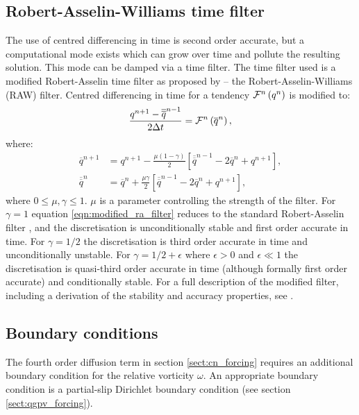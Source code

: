 \documentclass[a4paper]{book}
\begin{document}
\subsection{Robert-Asselin-Williams time filter}\label{sect:ra_filter}

The use of centred differencing in time is second order accurate, but a
computational mode exists which can grow over time and pollute the
resulting solution. This mode can be damped via a time filter. The time filter
used is a modified Robert-Asselin time filter as proposed by
\citet{williams2009a} -- the Robert-Asselin-Williams (RAW) filter. Centred
differencing in time for a tendency
${\cal{F}}^n \left( q^n \right)$ is modified to:
\begin{equation}
  \frac{q^{n + 1} - \overline{\overline{q}}^{n - 1}}{2 \Delta t} = {\cal{F}}^n \left( \overline{q}^n \right),
\end{equation}
where:
\begin{align}\label{eqn:modified_ra_filter}
  \overline{q}^{n + 1}        & = q^{n + 1} - \frac{\mu \left(1 - \gamma \right)}{2} \left[\overline{\overline{q}}^{n - 1} - 2 \overline{q}^n + q^{n + 1} \right], \nonumber \\
  \overline{\overline{q}}^{n} & = \overline{q}^n + \frac{\mu \gamma}{2} \left[\overline{\overline{q}}^{n - 1} - 2 \overline{q}^n + q^{n + 1} \right],
\end{align}
where $0 \leq \mu, \gamma \leq 1$. $\mu$ is a parameter controlling the strength
of the filter. For $\gamma = 1$ equation \eqref{eqn:modified_ra_filter} reduces to the
standard Robert-Asselin filter \citep{robert1966, asselin1972}, and the discretisation is
unconditionally stable and first order accurate in time. For $\gamma = 1 / 2$ the
discretisation is third order accurate in time and unconditionally unstable. For
$\gamma = 1 / 2 + \epsilon$ where $\epsilon > 0$ and $\epsilon \ll 1$ the
discretisation is quasi-third order accurate in time (although formally first
order accurate) and conditionally stable. For a full description of the modified
filter, including a derivation of the stability and accuracy properties, see
\citet{williams2009a}.

\subsection{Boundary conditions}\label{sect:cn_bc}

The fourth order diffusion term in section \ref{sect:cn_forcing}
requires an additional boundary condition for the relative vorticity $\omega$.
An appropriate boundary condition is a partial-slip Dirichlet boundary condition
(see section \ref{sect:qgpv_forcing}).
\end{document}
